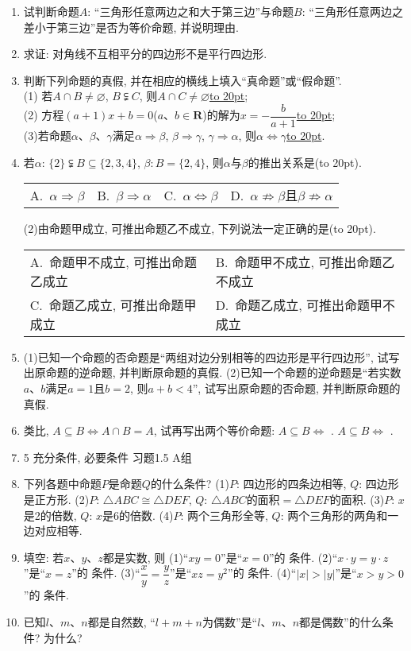 \documentclass[10pt,a4paper]{article}
\newcommand{\blank}[1]{\underline{\hbox to #1pt{}}}
\newcommand{\bracket}[1]{(\hbox to #1pt{})}
\newcommand{\twoch}[4]{\par\begin{tabular}{p{.46\textwidth}p{.46\textwidth}}
A.~#1& B.~#2\\
C.~#3& D.~#4
\end{tabular}}
\newcommand{\fourch}[4]{\par\begin{tabular}{p{.23\textwidth}p{.23\textwidth}p{.23\textwidth}p{.23\textwidth}}
A.~#1 &B.~#2& C.~#3& D.~#4
\end{tabular}}
\begin{document}
\begin{enumerate}[1.]
\item 试判断命题$A$: ``三角形任意两边之和大于第三边''与命题$B$: ``三角形任意两边之差小于第三边''是否为等价命题, 并说明理由.
\item 求证: 对角线不互相平分的四边形不是平行四边形.
\item 判断下列命题的真假, 并在相应的横线上填入``真命题''或``假命题''.\\
(1) 若$A\cap B\ne \varnothing$, $B\subsetneqq C$, 则$A\cap C\ne \varnothing$\blank{20};\\
(2) 方程$(a+1)x+b=0$($a$、$b\in \mathbf{R}$)的解为$x=-\dfrac b{a+1}$\blank{20};\\
(3)若命题$\alpha$、$\beta$、$\gamma$满足$\alpha \Rightarrow \beta$, $\beta \Rightarrow \gamma$, $\gamma \Rightarrow \alpha$, 则$\alpha \Leftrightarrow \gamma$\blank{20}.
\item 若$\alpha$: $\{2\}\subsetneqq B\subseteq \{2,3,4\}$, $\beta :B=\{2,4\}$, 则$\alpha$与$\beta$的推出关系是\bracket{20}.
\fourch{$\alpha \Rightarrow \beta$}{$\beta \Rightarrow \alpha$}{$\alpha \Leftrightarrow \beta$}{$\alpha \not\Rightarrow \beta$且$\beta \not\Rightarrow \alpha$}
(2)由命题甲成立, 可推出命题乙不成立, 下列说法一定正确的是\bracket{20}.
\twoch{命题甲不成立, 可推出命题乙成立}{命题甲不成立, 可推出命题乙不成立}{命题乙成立, 可推出命题甲成立}{命题乙成立, 可推出命题甲不成立}
\item (1)已知一个命题的否命题是``两组对边分别相等的四边形是平行四边形'', 试写出原命题的逆命题, 并判断原命题的真假.
(2)已知一个命题的逆命题是``若实数$a$、$b$满足$a=1$且$b=2$, 则$a+b<4$'', 试写出原命题的否命题, 并判断原命题的真假.
\item 类比, $A\subseteq B\Leftrightarrow A\cap B=A$, 试再写出两个等价命题:
$A\subseteq B\Leftrightarrow$ .
$A\subseteq B\Leftrightarrow$ .
\item 5  充分条件, 必要条件
习题1.5  A组
\item 下列各题中命题$P$是命题$Q$的什么条件?
(1)$P$: 四边形的四条边相等, 		$Q$: 四边形是正方形.
(2)$P$: $\triangle ABC\cong \triangle DEF$, 			$Q$: $\triangle ABC$的面积$=\triangle DEF$的面积.
(3)$P$: $x$是2的倍数, 				$Q$: $x$是6的倍数.
(4)$P$: 两个三角形全等, 			$Q$: 两个三角形的两角和一边对应相等.
\item 填空:
若$x$、$y$、$z$都是实数, 则
(1)``$xy=0$''是``$x=0$''的  条件.
(2)``$x\cdot y=y\cdot z$''是``$x=z$''的 条件.
(3)``$\dfrac xy=\dfrac yz$''是``$xz=y^2$''的 条件.
(4)``$|x|>|y|$''是``$x>y>0$''的 条件.
\item 已知$l$、$m$、$n$都是自然数, ``$l+m+n$为偶数''是``$l$、$m$、$n$都是偶数''的什么条件? 为什么?

\end{enumerate}
\end{document}
